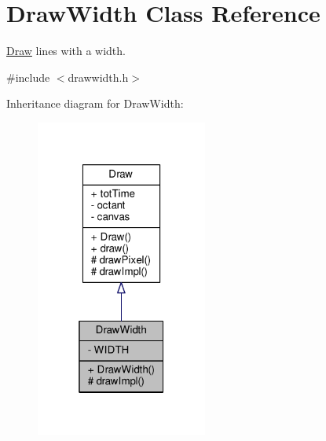 \hypertarget{classDrawWidth}{}\section{Draw\+Width Class Reference}
\label{classDrawWidth}


\hyperlink{classDraw}{Draw} lines with a width.  




{\ttfamily \#include $<$drawwidth.\+h$>$}



Inheritance diagram for Draw\+Width\+:
\nopagebreak
\begin{figure}[H]
\begin{center}
\leavevmode
\includegraphics[width=160pt]{classDrawWidth__inherit__graph}
\end{center}
\end{figure}


